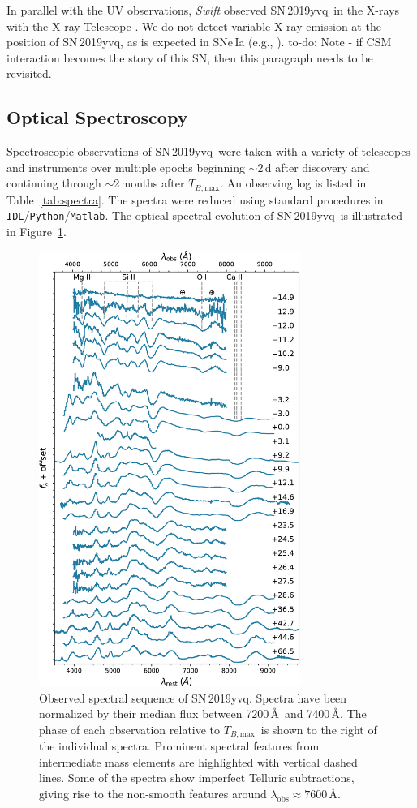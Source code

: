 \documentclass[twocolumn]{aastex63}
\newcommand{\todo}[1]{{\color{magenta} to-do: {#1}}}
\newcommand{\tbmax}{$T_{B,\mathrm{max}}$}
\newcommand{\sn}{SN\,2019yvq}
\begin{document}
In parallel with the UV observations, \textit{Swift} observed \sn\ in the
X-rays with the X-ray Telescope \citep{Burrows05}. We do not detect variable
X-ray emission at the position of \sn, as is expected in SNe\,Ia (e.g.,
\citealt{Margutti12}). \todo{Note - if CSM interaction becomes the story of
this SN, then this paragraph needs to be revisited.}

\subsection{Optical Spectroscopy}

Spectroscopic observations of \sn\ were taken with a variety of telescopes
and instruments over multiple epochs beginning $\sim$2\,d after discovery
and continuing through $\sim$2\,months after \tbmax. An observing log is
listed in Table~\ref{tab:spectra}. The spectra were reduced using standard
procedures in \texttt{IDL}/\texttt{Python}/\texttt{Matlab}. The optical
spectral evolution of \sn\ is illustrated in Figure~\ref{fig:spec_evo}.

\begin{figure}
    \centering
    \includegraphics[width=3.35in]{./figures/spec_evo.pdf}
    \caption{Observed spectral sequence of \sn. Spectra have been normalized
    by their median flux between 7200\,\AA\ and 7400\,\AA. The phase of each
    observation relative to \tbmax\ is shown to the right of the individual
    spectra. Prominent spectral features from intermediate mass elements are
    highlighted with vertical dashed lines. Some of the spectra show
    imperfect Telluric subtractions, giving rise to the non-smooth features
    around $\lambda_\mathrm{obs} \approx 7600$\,\AA.}
    \label{fig:spec_evo}
\end{figure}
\end{document}
